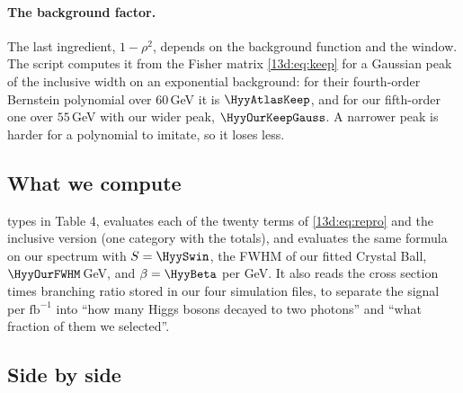 \paragraph{The background factor.}
The last ingredient, $1-\rho^2$, depends on the background function and the window. The
script computes it from the Fisher matrix \eqref{13d:eq:keep} for a Gaussian peak of the
inclusive width on an exponential background: for their fourth-order Bernstein polynomial
over $60\,$GeV it is $\HyyAtlasKeep$, and for our fifth-order one over $55\,$GeV with our
wider peak, $\HyyOurKeepGauss$. A narrower peak is harder for a polynomial to imitate, so
it loses less.

\subsection{What we compute}
\label{13d:sec:repro-compute}

 types in Table 4, evaluates each of the twenty
terms of \eqref{13d:eq:repro} and the inclusive version (one category with the totals),
and evaluates the same formula on our spectrum with $S=\HyySwin$, the FWHM of our fitted
Crystal Ball, $\HyyOurFWHM\,$GeV, and $\beta=\HyyBeta$ per GeV. It also reads the cross
section times branching ratio stored in our four simulation files, to separate the
signal per $\mathrm{fb}^{-1}$ into ``how many Higgs bosons decayed to two photons'' and
``what fraction of them we selected''.

\subsection{Side by side}
\label{13d:sec:repro-side}

